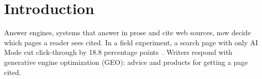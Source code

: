 \section{Introduction}
\label{sec:intro}

Answer engines, systems that answer in prose and cite web sources, now decide which pages a reader sees cited.
In a field experiment, a search page with only AI Mode cut click-through by 18.8 percentage points~\cite{wang2026aisearch}.
Writers respond with generative engine optimization (GEO): advice and products for getting a page cited.

